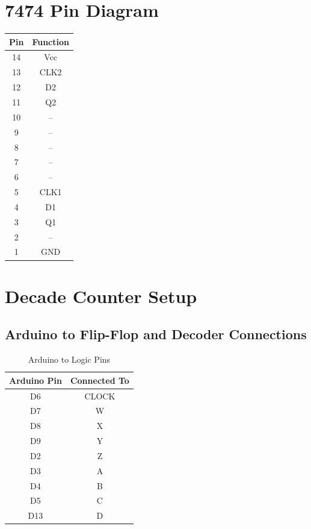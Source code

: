 \documentclass[12pt]{article}
\begin{document}
\section{7474 Pin Diagram}
\begin{center}
\begin{tabular}{|c|c|}
\hline
\textbf{Pin} & \textbf{Function} \\
\hline
14 & Vcc \\
13 & CLK2 \\
12 & D2 \\
11 & Q2 \\
10 & -- \\
9 & -- \\
8 & -- \\
7 & -- \\
6 & -- \\
5 & CLK1 \\
4 & D1 \\
3 & Q1 \\
2 & -- \\
1 & GND \\
\hline
\end{tabular}
\end{center}

\section{Decade Counter Setup}

\subsection{Arduino to Flip-Flop and Decoder Connections}
\begin{table}[h!]
\centering
\begin{tabular}{|c|c|}
\hline
\textbf{Arduino Pin} & \textbf{Connected To} \\
\hline
D6 & CLOCK \\
D7 & W \\
D8 & X \\
D9 & Y \\
D2 & Z \\
D3 & A \\
D4 & B \\
D5 & C \\
D13 & D \\
\hline
\end{tabular}
\caption{Arduino to Logic Pins}
\end{table}
\end{document}
